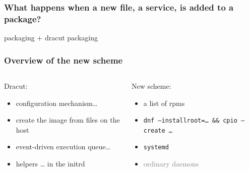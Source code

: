 \documentclass[]{beamer}
\begin{document}
\begin{frame}
  \frametitle{What happens when a new file, a service, is added to a package?}

  packaging + dracut packaging
\end{frame}

\begin{frame}
  \frametitle{Overview of the new scheme}

  \begin{columns}
    \begin{column}[t]{0.5\textwidth}
      Dracut:
      \begin{itemize}
      \item configuration mechanism…
      \item create the image from files on the host
      \item event-driven execution queue…
      \item helpers … in the initrd
      \end{itemize}
    \end{column}         %
    \pause

    \begin{column}[t]{0.5\textwidth}
      New scheme:
      \begin{itemize}
      \item a list of rpms
        \pause
      \item \texttt{dnf --installroot=… \&\& cpio --create …}
        \pause
      \item \texttt{systemd}\\\phantom{X}
        \pause
      \item 
        \textcolor{gray}{ordinary daemons}
      \end{itemize}
    \end{column}
  \end{columns}
\end{frame}


\end{document}
